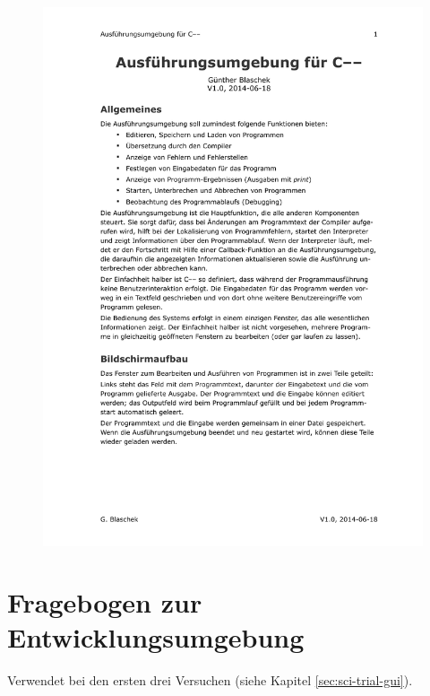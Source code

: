 \documentclass[11pt, oneside]{book}   		%
\begin{document}
\begin{figure}[h!]
	\centering
	\includegraphics[width=1.0\textwidth]{./media/docs/Anforderung-gui.pdf}
\end{figure}

\pagebreak
\section{Fragebogen zur Entwicklungsumgebung}
Verwendet bei den ersten drei Versuchen (siehe Kapitel \ref{sec:sci-trial-gui}).
\end{document}
